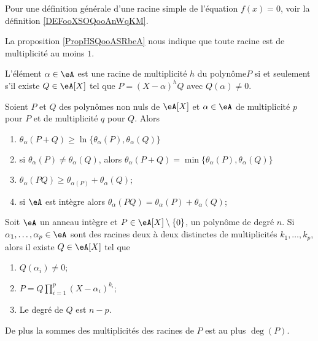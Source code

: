 Pour une définition générale d'une racine simple de l'équation \( f(x)=0\), voir la définition \ref{DEFooXSOQooAnWqKM}.

La proposition \ref{PropHSQooASRbeA} nous indique que toute racine est de multiplicité au moins \( 1\).

\begin{proposition}     \label{PropahQQpA}
    L'élément \( \alpha\in \eA\) est une racine de multiplicité \( h\) du polynôme\( P\) si et seulement s'il existe \( Q\in\eA[X]\) tel que \( P=(X-\alpha)^hQ\) avec \( Q(\alpha)\neq 0\).
\end{proposition}

\begin{lemma}       \label{LemIeLhpc}
    Soient \( P\) et \( Q\) des polynômes non nuls de \( \eA[X]\) et \( \alpha\in \eA\) de multiplicité \( p\) pour \( P\) et de multiplicité \( q\) pour \( Q\). Alors
    \begin{enumerate}
        \item
            \( \theta_{\alpha}(P+Q)\geq\ln\{ \theta_{\alpha}(P),\theta_{\alpha}(Q) \}\)
        \item
            si \( \theta_{\alpha}(P)\neq \theta_{\alpha}(Q)\), alors \( \theta_{\alpha}(P+Q)=\min\{ \theta_{\alpha}(P),\theta_{\alpha}(Q) \}\)
        \item
            \( \theta_{\alpha}(PQ)\geq \theta_{\alpha(P)}+\theta_{\alpha}(Q)\);
        \item       \label{ItemIeLhpciv}
            si \(\eA \) est intègre alors \( \theta_{\alpha}(PQ)= \theta_{\alpha}(P)+\theta_{\alpha}(Q)\);
    \end{enumerate}
\end{lemma}

\begin{theorem} \label{ThoSVZooMpNANi}
    Soit \( \eA\) un anneau intègre et \( P\in \eA[X]\setminus\{ 0 \}\), un polynôme de degré \( n\). Si \( \alpha_1,\ldots, \alpha_p\in\eA\) sont des racines deux à deux distinctes de multiplicités \( k_1,\ldots, k_p\), alors il existe \( Q\in \eA[X]\) tel que
    \begin{enumerate}
        \item
            \( Q(\alpha_i)\neq 0\);
        \item   \label{ItemJZZVooMogYLq}
            \( P=Q\prod_{i=1}^p(X-\alpha_i)^{k_i}\);
        \item
            Le degré de \( Q\) est \( n-p\).
    \end{enumerate}
    De plus la sommes des multiplicités des racines de \( P\) est au plus \( \deg(P)\).
\end{theorem}

